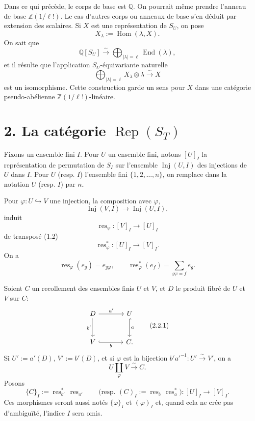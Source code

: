 \documentclass[11pt]{article}
\newcommand{\Rep}{\operatorname{Rep}}
\newcommand{\Hom}{\operatorname{Hom}}
\newcommand{\End}{\operatorname{End}}
\newcommand{\Inj}{\operatorname{Inj}}
\newcommand{\res}{\operatorname{res}}
\newcommand{\Z}{\mathbb Z}
\newcommand{\Q}{\mathbb Q}
\theoremstyle{deligne}
\newcommand{\para}[1]{\vspace{0.65em}\noindent{\bfseries #1}\quad}
\begin{document}
Dans ce qui précède, le corps de base est \(\Q\). On pourrait même prendre l'anneau de base \(\Z(1/\ell!)\). Le cas d'autres corps ou anneaux de base s'en déduit par extension des scalaires. Si \(X\) est une représentation de \(S_U\), on pose
\[
  X_\lambda:=\Hom(\lambda,X).
  \tag{1.10.1}
\]
On sait que
\[
  \Q[S_U]\overset{\sim}{\longrightarrow}
  \bigoplus_{|\lambda|=\ell}\End(\lambda),
  \tag{1.10.2}
\]
et il résulte que l'application \(S_U\)-équivariante naturelle
\[
  \bigoplus_{|\lambda|=\ell}X_\lambda\otimes\lambda
  \overset{\sim}{\longrightarrow} X
  \tag{1.10.3}
\]
est un isomorphisme. Cette construction garde un sens pour \(X\) dans une catégorie pseudo-abélienne \(\Z(1/\ell!)\)-linéaire.

\section*{2. La catégorie \(\Rep(S_T)\)}

\para{2.1.}
Fixons un ensemble fini \(I\). Pour \(U\) un ensemble fini, notons \([U]_I\) la représentation de permutation de \(S_I\) sur l'ensemble \(\Inj(U,I)\) des injections de \(U\) dans \(I\). Pour \(U\) (resp. \(I\)) l'ensemble fini \(\{1,2,\ldots,n\}\), on remplace dans la notation \(U\) (resp. \(I\)) par \(n\).

Pour \(\varphi:U\hookrightarrow V\) une injection, la composition avec \(\varphi\),
\[
  \Inj(V,I)\longrightarrow \Inj(U,I),
\]
induit
\[
  \res_\varphi:[V]_I\longrightarrow [U]_I
\]
de transposé (1.2)
\[
  \res_\varphi^*:[U]_I\longrightarrow [V]_I.
\]
On a
\[
  \res_\varphi(e_g)=e_{g\varphi},\qquad
  \res_\varphi^*(e_f)=\sum_{g\varphi=f} e_g.
\]

\para{2.2.}
Soient \(C\) un recollement des ensembles finis \(U\) et \(V\), et \(D\) le produit fibré de \(U\) et \(V\) sur \(C\):
\[
\begin{tikzcd}[column sep=large,row sep=large]
D \arrow[r,"a'"] \arrow[d,"b'"'] & U \arrow[d,"a",hook]\\
V \arrow[r,"b"',hook] & C .
\end{tikzcd}
\tag{2.2.1}
\]
Si \(U':=a'(D)\), \(V':=b'(D)\), et si \(\varphi\) est la bijection \(b'a'^{-1}:U'\overset{\sim}{\to}V'\), on a
\[
  U\coprod_\varphi V\overset{\sim}{\longrightarrow}C.
\]
Posons
\[
  \{C\}_I:=\res_{b'}^*\,\res_{a'}
  \qquad
  \text{(resp. }(C)_I:=\res_b\,\res_a^*\text{)}:
  [U]_I\longrightarrow [V]_I.
\]
Ces morphismes seront aussi notés \(\{\varphi\}_I\) et \((\varphi)_I\) et, quand cela ne crée pas d'ambiguïté, l'indice \(I\) sera omis.
\end{document}
